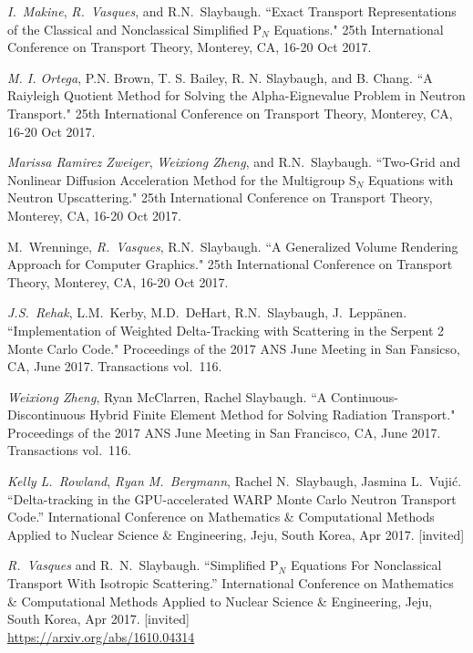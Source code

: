 \begin{bibsection}
\item  \textit{I.\ Makine}, \textit{R.\ Vasques}, and R.N.\ Slaybaugh. ``Exact Transport Representations of the Classical and Nonclassical Simplified P$_N$ Equations." 25th International Conference on Transport Theory, Monterey, CA, 16-20 Oct 2017.

\item \textit{M. I. Ortega}, P.N. Brown, T. S. Bailey, R. N. Slaybaugh, and B. Chang. ``A Raiyleigh Quotient Method for Solving the Alpha-Eignevalue Problem in Neutron Transport." 25th International Conference on Transport Theory, Monterey, CA, 16-20 Oct 2017.

\item  \textit{Marissa Ramirez Zweiger}, \textit{Weixiong Zheng}, and R.N.\ Slaybaugh. ``Two-Grid and Nonlinear Diffusion Acceleration Method for the Multigroup S$_N$ Equations with Neutron Upscattering." 25th International Conference on Transport Theory, Monterey, CA, 16-20 Oct 2017.

\item M.\ Wrenninge, \textit{R.\ Vasques}, R.N.\ Slaybaugh. ``A Generalized Volume Rendering Approach for Computer Graphics." 25th International Conference on Transport Theory, Monterey, CA, 16-20 Oct 2017.

\item \textit{J.S.\ Rehak}, L.M.\ Kerby, M.D.\ DeHart, R.N.\ Slaybaugh, J.\ Lepp\"{a}nen. ``Implementation of Weighted Delta-Tracking with Scattering in the Serpent 2 Monte Carlo Code." Proceedings of the 2017 ANS June Meeting in San Fansicso, CA, June 2017. Transactions vol.\ 116.

\item\textit{ Weixiong Zheng}, Ryan McClarren, Rachel Slaybaugh. ``A Continuous-Discontinuous Hybrid Finite Element Method for Solving Radiation Transport." Proceedings of the 2017 ANS June Meeting in San Francisco, CA, June 2017. Transactions vol.\ 116.

\item \textit{Kelly L.\ Rowland}, \textit{Ryan M.\ Bergmann}, Rachel N.\ Slaybaugh, Jasmina L.\ Vuji\'c. ``Delta-tracking in the GPU-accelerated WARP Monte Carlo Neutron Transport Code.'' International Conference on Mathematics \& Computational Methods Applied to Nuclear Science \& Engineering, Jeju, South Korea, Apr 2017. [invited]

\item \textit{R.\ Vasques} and R.\ N.\ Slaybaugh. ``Simplified P$_N$ Equations For Nonclassical Transport With Isotropic Scattering.'' International Conference on Mathematics \& Computational Methods Applied to Nuclear Science \& Engineering, Jeju, South Korea, Apr 2017. [invited]\\
\url{https://arxiv.org/abs/1610.04314}


\end{bibsection}
